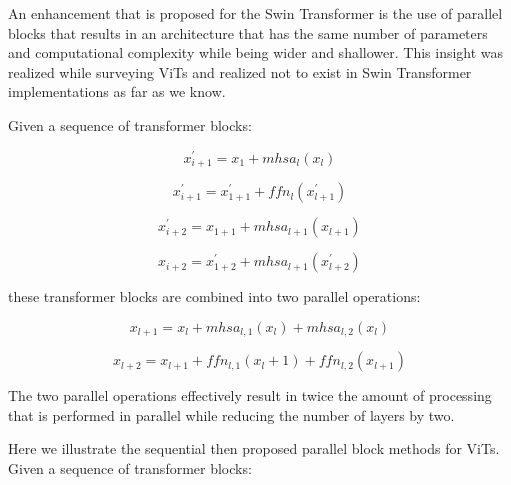 \documentclass[10pt,twocolumn,letterpaper]{article}
\begin{document}

An enhancement that is proposed for the Swin Transformer is the use of parallel blocks that results in an architecture that has the same number of parameters and computational complexity while being wider and shallower. This insight was realized while surveying ViTs\cite{touvron2022three} and realized not to exist in Swin Transformer implementations as far as we know.

Given a sequence of transformer blocks:

\begin{equation}
x^{'}_{i+1} = x_1 + mhsa_l(x_l)
\end{equation}

\begin{equation}
x^{'}_{i+1} = x^{'}_{1+1} + ffn_l(x^{'}_{l+1})
\end{equation}

\begin{equation}
x^{'}_{i+2} = x_{1+1} + mhsa_{l+1}(x_{l+1})
\end{equation}

\begin{equation}
x_{i+2} = x^{'}_{1+2} + mhsa_{l+1}(x^{'}_{l+2})
\end{equation}

these transformer blocks are combined into two parallel operations:

\begin{equation}
x_{l+1} = x_{l} + mhsa_{l,1}(x_l) + mhsa_{l,2}(x_l)
\end{equation}

\begin{equation}
x_{l+2} = x_{l+1} + ffn_{l,1}(x_l+1) + ffn_{l,2}(x_{l+1})
\end{equation}

The two parallel operations effectively result in twice the amount of processing that is performed in parallel while reducing the number of layers by two.

Here we illustrate the sequential then proposed parallel block methods for ViTs. Given a sequence of transformer blocks:
\end{document}
